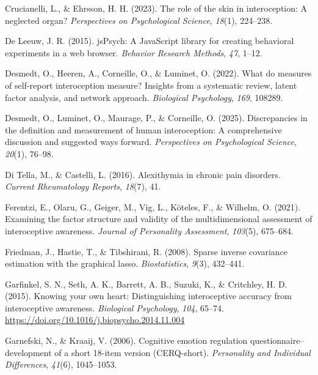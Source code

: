 \documentclass[
  jou,
  floatsintext,
  longtable,
  nolmodern,
  notxfonts,
  notimes,
  colorlinks=true,linkcolor=blue,citecolor=blue,urlcolor=blue]{apa7}
\newlength{\cslhangindent}
\newenvironment{CSLReferences}[2] %
 {\begin{list}{}{%
  \setlength{\itemindent}{0pt}
  \setlength{\leftmargin}{0pt}
  \setlength{\parsep}{0pt}
  \ifodd #1
   \setlength{\leftmargin}{\cslhangindent}
   \setlength{\itemindent}{-1\cslhangindent}
  \fi
  \setlength{\itemsep}{#2\baselineskip}}}
 {\end{list}}
\begin{document}
\begin{CSLReferences}{1}{0}
Crucianelli, L., \& Ehrsson, H. H. (2023). The role of the skin in
interoception: A neglected organ? \emph{Perspectives on Psychological
Science}, \emph{18}(1), 224--238.

De Leeuw, J. R. (2015). jsPsych: A JavaScript library for creating
behavioral experiments in a web browser. \emph{Behavior Research
Methods}, \emph{47}, 1--12.

Desmedt, O., Heeren, A., Corneille, O., \& Luminet, O. (2022). What do
measures of self-report interoception measure? Insights from a
systematic review, latent factor analysis, and network approach.
\emph{Biological Psychology}, \emph{169}, 108289.

Desmedt, O., Luminet, O., Maurage, P., \& Corneille, O. (2025).
Discrepancies in the definition and measurement of human interoception:
A comprehensive discussion and suggested ways forward.
\emph{Perspectives on Psychological Science}, \emph{20}(1), 76--98.

Di Tella, M., \& Castelli, L. (2016). Alexithymia in chronic pain
disorders. \emph{Current Rheumatology Reports}, \emph{18}(7), 41.

Ferentzi, E., Olaru, G., Geiger, M., Vig, L., Köteles, F., \& Wilhelm,
O. (2021). Examining the factor structure and validity of the
multidimensional assessment of interoceptive awareness. \emph{Journal of
Personality Assessment}, \emph{103}(5), 675--684.

Friedman, J., Hastie, T., \& Tibshirani, R. (2008). Sparse inverse
covariance estimation with the graphical lasso. \emph{Biostatistics},
\emph{9}(3), 432--441.

Garfinkel, S. N., Seth, A. K., Barrett, A. B., Suzuki, K., \& Critchley,
H. D. (2015). Knowing your own heart: Distinguishing interoceptive
accuracy from interoceptive awareness. \emph{Biological Psychology},
\emph{104}, 65--74.
\url{https://doi.org/10.1016/j.biopsycho.2014.11.004}

Garnefski, N., \& Kraaij, V. (2006). Cognitive emotion regulation
questionnaire--development of a short 18-item version (CERQ-short).
\emph{Personality and Individual Differences}, \emph{41}(6), 1045--1053.


\end{CSLReferences}
\end{document}
